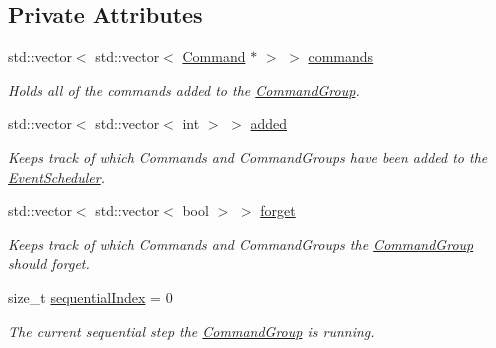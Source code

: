 \subsection*{Private Attributes}
\begin{DoxyCompactItemize}
\item 
std\+::vector$<$ std\+::vector$<$ \mbox{\hyperlink{classlib_iterative_robot_1_1_command}{Command}} $\ast$ $>$ $>$ \mbox{\hyperlink{classlib_iterative_robot_1_1_command_group_aa7a293ed14071e183070e00580ccbecf}{commands}}
\begin{DoxyCompactList}\small\item\em Holds all of the commands added to the \mbox{\hyperlink{classlib_iterative_robot_1_1_command_group}{Command\+Group}}. \end{DoxyCompactList}\item 
\mbox{\label{classlib_iterative_robot_1_1_command_group_a93fe86db750ed4c728626eace7e66a2f}} 
std\+::vector$<$ std\+::vector$<$ int $>$ $>$ \mbox{\hyperlink{classlib_iterative_robot_1_1_command_group_a93fe86db750ed4c728626eace7e66a2f}{added}}
\begin{DoxyCompactList}\small\item\em Keeps track of which Commands and Command\+Groups have been added to the \mbox{\hyperlink{classlib_iterative_robot_1_1_event_scheduler}{Event\+Scheduler}}. \end{DoxyCompactList}\item 
\mbox{\label{classlib_iterative_robot_1_1_command_group_ae6779a068983b84e265c0ff4fc74488d}} 
std\+::vector$<$ std\+::vector$<$ bool $>$ $>$ \mbox{\hyperlink{classlib_iterative_robot_1_1_command_group_ae6779a068983b84e265c0ff4fc74488d}{forget}}
\begin{DoxyCompactList}\small\item\em Keeps track of which Commands and Command\+Groups the \mbox{\hyperlink{classlib_iterative_robot_1_1_command_group}{Command\+Group}} should forget. \end{DoxyCompactList}\item 
\mbox{\label{classlib_iterative_robot_1_1_command_group_ae6ba0e30e4caa58f4b019ab496487ab7}} 
size\+\_\+t \mbox{\hyperlink{classlib_iterative_robot_1_1_command_group_ae6ba0e30e4caa58f4b019ab496487ab7}{sequential\+Index}} = 0
\begin{DoxyCompactList}\small\item\em The current sequential step the \mbox{\hyperlink{classlib_iterative_robot_1_1_command_group}{Command\+Group}} is running. \end{DoxyCompactList}\end{DoxyCompactItemize}
